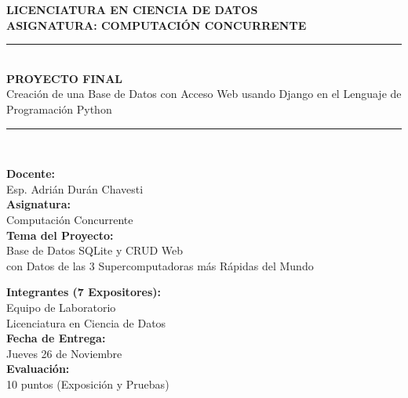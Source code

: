 \documentclass[11pt,a4paper]{article}
\begin{document}
\begin{titlepage}
    \centering
    \vspace*{0.5cm}
    
    {\Large \textbf{LICENCIATURA EN CIENCIA DE DATOS}}\\[0.3cm]
    {\large \textbf{ASIGNATURA: COMPUTACIÓN CONCURRENTE}}\\[1.8cm]
    
    \rule{\linewidth}{1.2pt}\\[0.4cm]
    {\LARGE \bfseries PROYECTO FINAL}\\[0.3cm]
    {\Large Creación de una Base de Datos con Acceso Web usando Django en el Lenguaje de Programación Python}\\[0.3cm]
    \rule{\linewidth}{1.2pt}\\[1.5cm]
    
    \begin{minipage}{0.48\textwidth}
        \begin{flushleft} \normalsize
            \textbf{Docente:}\\
            Esp. Adrián Durán Chavesti\\[0.6cm]
            \textbf{Asignatura:}\\
            Computación Concurrente\\[0.6cm]
            \textbf{Tema del Proyecto:}\\
            Base de Datos SQLite y CRUD Web\\
            con Datos de las 3 Supercomputadoras más Rápidas del Mundo
        \end{flushleft}
    \end{minipage}
    \begin{minipage}{0.48\textwidth}
        \begin{flushright} \normalsize
            \textbf{Integrantes (7 Expositores):}\\
            Equipo de Laboratorio\\
            Licenciatura en Ciencia de Datos\\[0.6cm]
            \textbf{Fecha de Entrega:}\\
            Jueves 26 de Noviembre\\[0.6cm]
            \textbf{Evaluación:}\\
            10 puntos (Exposición y Pruebas)
        \end{flushright}
    \end{minipage}
    

\end{titlepage}
\end{document}
